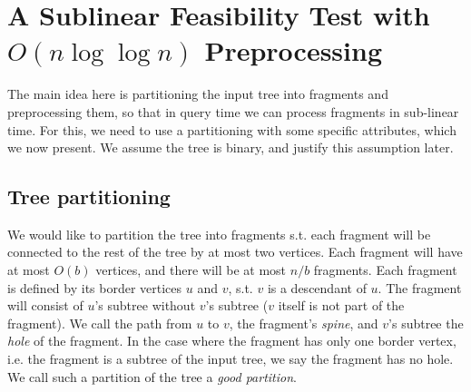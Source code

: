 \documentclass[11pt,a4paper]{article}
\theoremstyle{definition}
\theoremstyle{remark}
\begin{document}
\section{A Sublinear Feasibility Test with \boldmath
$O(n\log\log n)$ Preprocessing}\label{sublinear f.t.}
The main idea here is partitioning the input tree into fragments and preprocessing them, so that in query time we can process fragments in sub-linear time. For this, we need to use a partitioning with some specific attributes, which we now present. We assume the tree is binary, and justify this assumption later.
\subsection{Tree partitioning}\label{tree partitioning}
We would like to partition the tree into fragments s.t. each fragment will be connected to the rest of the tree by at most two vertices. Each fragment will have at most $O(b)$ vertices, and there will be at most $n/b$ fragments. Each fragment is defined by its border vertices $u$ and $v$, s.t. $v$ is a descendant of $u$. The fragment will consist of $u$'s subtree without $v$'s subtree ($v$ itself is not part of the fragment). We call the path from $u$ to $v$, the fragment's \textit{spine}, and $v$'s subtree the \textit{hole} of the fragment. In the case where the fragment has only one border vertex, i.e. the fragment is a subtree of the input tree, we say the fragment has no hole. We call such a partition of the tree a \emph{good partition}.
\end{document}
